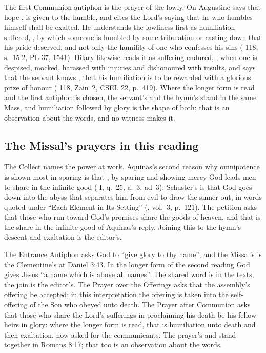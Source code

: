 The first Communion antiphon is the prayer of the lowly. On  Augustine says that hope , is given
to the humble, and cites the Lord's saying that he who humbles himself shall be
exalted. He understands the lowliness first as humiliation suffered,
, by which someone is humbled by some tribulation or casting
down that his pride deserved, and not only the humility of one who confesses
his sins ( 118, s.~15.2, PL 37, 1541). Hilary
likewise reads it as suffering endured, , when one is despised,
mocked, harassed with injuries and dishonoured with insults, and says that the
servant knows , that his humiliation is to be rewarded with a glorious prize of
honour ( 118, Zain~2, CSEL 22, p.~419). Where the
longer form is read and the first antiphon is chosen, the servant's
 and the hymn's
 stand in the same Mass, and humiliation followed
by glory is the shape of both; that is an observation about the words, and no
witness makes it.

\subsection{The Missal's prayers in this reading}

The Collect names the power at work. Aquinas's second reason why omnipotence is
shown most in sparing is that , by sparing and showing mercy God leads
men to share in the infinite good ( I, q.~25, a.~3,
ad~3); Schuster's is that God goes down into the abyss that separates him from
evil to draw the sinner out, in words quoted under ``Each Element in Its
Setting'' (, vol.~3, p.~121). The petition asks
that those who run toward God's promises share the goods of heaven, and that
is the share in the infinite good of Aquinas's reply. Joining this to the
hymn's descent and exaltation is the editor's.

The Entrance Antiphon asks God to ``give glory to thy name'', and the
Missal's  is the Clementine's at Daniel 3:43. In
the longer form of the second reading God gives Jesus ``a name which is above
all names''. The shared word is in the texts; the join is the editor's. The
Prayer over the Offerings asks that the assembly's offering be accepted; in
this interpretation the offering is taken into the self-offering of the Son who
obeyed unto death. The Prayer after Communion asks that those who share the
Lord's sufferings in proclaiming his death be his fellow heirs in glory: where
the longer form is read, that is humiliation unto death and then exaltation,
now asked for the communicants. The prayer's  and
 stand together in Romans 8:17; that too is an observation
about the words.

